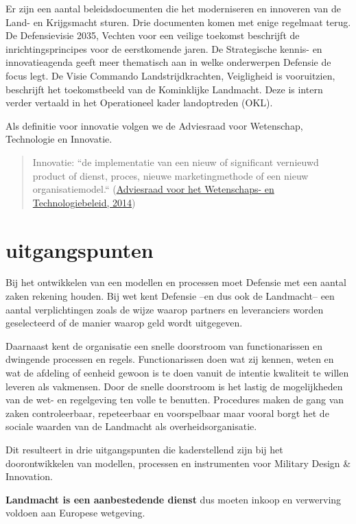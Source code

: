 \documentclass[
]{book}
\begin{document}
Er zijn een aantal beleidsdocumenten die het moderniseren en innoveren van de Land- en Krijgsmacht sturen. Drie documenten komen met enige regelmaat terug. De Defensievisie 2035, Vechten voor een veilige toekomst beschrijft de inrichtingsprincipes voor de eerstkomende jaren. De Strategische kennis- en innovatieagenda geeft meer thematisch aan in welke onderwerpen Defensie de focus legt. De Visie Commando Landstrijdkrachten, Veigligheid is vooruitzien, beschrijft het toekomstbeeld van de Kominklijke Landmacht. Deze is intern verder vertaald in het Operationeel kader landoptreden (OKL).

Als definitie voor innovatie volgen we de Adviesraad voor Wetenschap, Technologie en Innovatie.

\begin{quote}
Innovatie: ``de implementatie van een nieuw of significant vernieuwd product of dienst, proces, nieuwe marketingmethode of een nieuw organisatiemodel.`` (\protect\hyperlink{ref-awti-2014}{Adviesraad voor het Wetenschaps- en Technologiebeleid, 2014})
\end{quote}

\hypertarget{uitgangspunten}{%
\section{uitgangspunten}\label{uitgangspunten}}

Bij het ontwikkelen van een modellen en processen moet Defensie met een aantal zaken rekening houden. Bij wet kent Defensie --en dus ook de Landmacht-- een aantal verplichtingen zoals de wijze waarop partners en leveranciers worden geselecteerd of de manier waarop geld wordt uitgegeven.

Daarnaast kent de organisatie een snelle doorstroom van functionarissen en dwingende processen en regels.
Functionarissen doen wat zij kennen, weten en wat de afdeling of eenheid gewoon is te doen vanuit de intentie kwaliteit te willen leveren als vakmensen. Door de snelle doorstroom is het lastig de mogelijkheden van de wet- en regelgeving ten volle te benutten.
Procedures maken de gang van zaken controleerbaar, repeteerbaar en voorspelbaar maar vooral borgt het de sociale waarden van de Landmacht als overheidsorganisatie.

Dit resulteert in drie uitgangspunten die kaderstellend zijn bij het doorontwikkelen van modellen, processen en instrumenten voor Military Design \& Innovation.

\textbf{Landmacht is een aanbestedende dienst}
dus moeten inkoop en verwerving voldoen aan Europese wetgeving.
\end{document}
